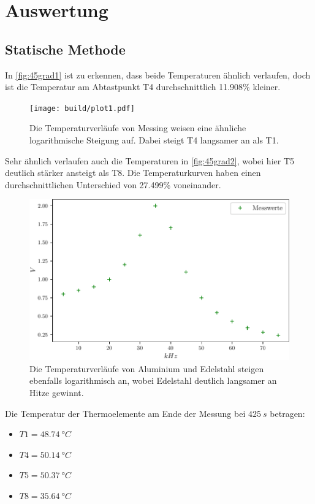 \section{Auswertung}
\label{sec:Auswertung}

\subsection{Statische Methode}

In \autoref{fig:45grad1} ist zu erkennen, dass beide Temperaturen ähnlich verlaufen, doch ist die Temperatur am Abtastpunkt T4 durchschnittlich 11.908\% kleiner.

\begin{figure}
    \centering
    \texttt{[image: build/plot1.pdf]}
    \caption{Die Temperaturverläufe von Messing  weisen eine ähnliche logarithmische Steigung auf. Dabei steigt T4 langsamer an als T1.}
    \label{fig:45grad1}
\end{figure}

Sehr ähnlich verlaufen auch die Temperaturen in \autoref{fig:45grad2}, wobei hier T5 deutlich stärker ansteigt als T8.
Die Temperaturkurven haben einen durchschnittlichen Unterschied von 27.499\% voneinander.

\begin{figure}
    \centering
    \includegraphics[scale=0.7]{build/plot2.pdf}
    \caption{Die Temperaturverläufe von Aluminium und Edelstahl steigen ebenfalls logarithmisch an, wobei Edelstahl deutlich langsamer an Hitze gewinnt.}
    \label{fig:45grad2}
\end{figure}
Die Temperatur der Thermoelemente am Ende der Messung bei $425\ s$ betragen:

\begin{itemize}
    \centering
    \item[] $T1 = 48.74\ °C$ 
    \item[] $T4 = 50.14\ °C$
    \item[] $T5 = 50.37\ °C$
    \item[] $T8 = 35.64\ °C$
\end{itemize}

